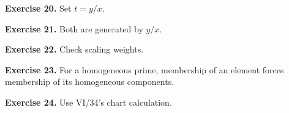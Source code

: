 \textbf{Exercise 20.} Set \(t=y/x\).\par

\textbf{Exercise 21.} Both are generated by \(y/x\).\par

\textbf{Exercise 22.} Check scaling weights.\par

\textbf{Exercise 23.} For a homogeneous prime, membership of an element forces membership of its homogeneous components.\par

\textbf{Exercise 24.} Use VI/34's chart calculation.\par